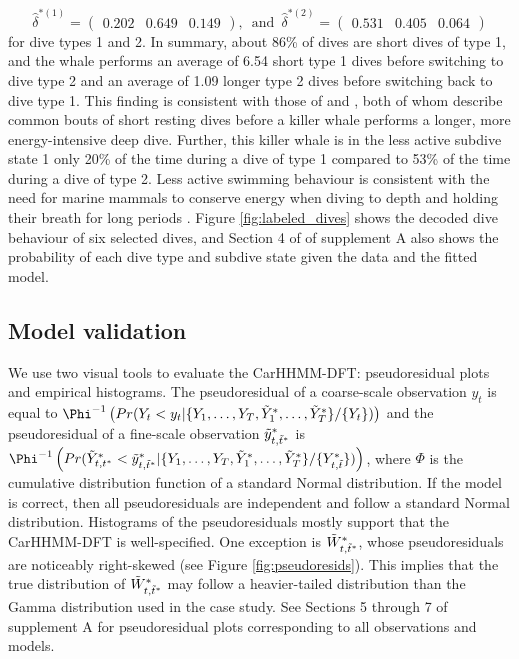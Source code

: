 \[\hat \delta^{*(1)} = \begin{pmatrix} 0.202 & 0.649 & 0.149 \end{pmatrix}, \enspace \text{and} \enspace \hat \delta^{*(2)} = \begin{pmatrix} 0.531 & 0.405 & 0.064 \end{pmatrix}\]
%
for dive types 1 and 2.
In summary, about 86\% of dives are short dives of type 1, and the whale performs an average of 6.54 short type 1 dives before switching to dive type 2 and an average of 1.09 longer type 2 dives before switching back to dive type 1. This finding is consistent with those of \citet{Tennessen:2019b} and \citet{Williams:2009}, both of whom describe common bouts of short resting dives before a killer whale performs a longer, more energy-intensive deep dive.
Further, this killer whale is in the less active subdive state 1 only 20\% of the time during a dive of type 1 compared to 53\% of the time during a dive of type 2. Less active swimming behaviour is consistent with the need for marine mammals to conserve energy when diving to depth and holding their breath for long periods \citep{Williams:1999,Hastie:2006}. Figure \ref{fig:labeled_dives} shows the decoded dive behaviour of six selected dives, and Section 4 of of supplement A also shows the probability of each dive type and subdive state given the data and the fitted model.

\subsection{Model validation}
\label{subsec:model_validation}

We use two visual tools to evaluate the CarHHMM-DFT: pseudoresidual plots and empirical histograms. The pseudoresidual of a coarse-scale observation $y_t$ is equal to $\Phi^{-1} \left(Pr(Y_t < y_t|\{Y_1,\ldots,Y_T,\Z_1,\ldots,\Z_T\}/\{Y_t\}) \right)$ and the pseudoresidual of a fine-scale observation $\tilde{y}^*_{t,\tilde t^*}$ is $\Phi^{-1} \left(Pr(\Z_{t,t^*} < \z_{t,\tilde t^*}|\{Y_1,\ldots,Y_T,\Z_1,\ldots,\Z_T\}/\{Y^*_{t,\tilde t}\}) \right)$, where $\Phi$ is the cumulative distribution function of a standard Normal distribution. If the model is correct, then all pseudoresiduals are independent and follow a standard Normal distribution. Histograms of the pseudoresiduals mostly support that the CarHHMM-DFT is well-specified. One exception is $\tilde{W}^*_{t,\tilde t^*}$, whose pseudoresiduals are noticeably right-skewed (see Figure \ref{fig:pseudoresids}). This implies that the true distribution of $\tilde{W}^*_{t,\tilde t^*}$ may follow a heavier-tailed distribution than the Gamma distribution used in the case study. See Sections 5 through 7 of supplement A for pseudoresidual plots corresponding to all observations and models.

